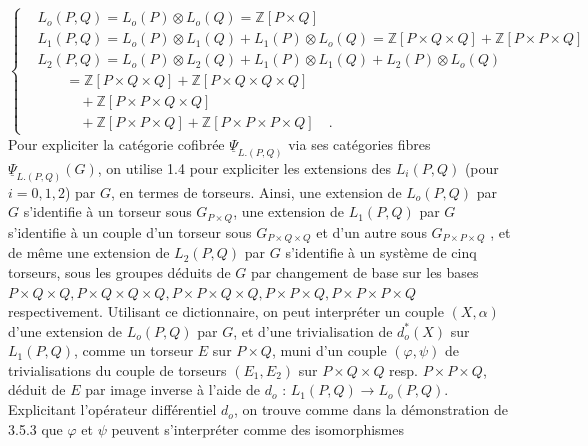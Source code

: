 \begin{equation}\tag{3.6.6}
\left\{
\begin{aligned}
&L_o(P,Q) = L_o(P) \otimes L_o(Q) = \mathbb{Z}[P\times Q] \\
&L_1(P,Q) = L_o(P) \otimes L_1(Q) + L_1(P) \otimes L_o(Q) = \mathbb{Z}[P\times Q\times Q] + \mathbb{Z}[P\times P\times Q] \\
&L_2(P,Q) = L_o(P) \otimes L_2(Q) + L_1(P) \otimes L_1(Q) + L_2(P) \otimes L_o(Q) \\
&\qquad = \mathbb{Z}[P\times Q\times Q] + \mathbb{Z}[P\times Q\times Q\times Q] \\
&\qquad\quad + \mathbb{Z}[P\times P\times Q\times Q] \\
&\qquad\quad + \mathbb{Z}[P\times P\times Q] + \mathbb{Z}[P\times P\times P\times Q] \quad .
\end{aligned}
\right.
\end{equation}
Pour expliciter la catégorie cofibrée $\underline{\Psi}_{L.(P,Q)}$ via ses catégories fibres $\underline{\Psi}_{L.(P,Q)}(G)$, on utilise 1.4 pour expliciter les extensions des $L_i(P,Q)$ (pour $i=0,1,2$) par $G$, en termes de torseurs. Ainsi, une extension de $L_o(P,Q)$ par $G$ s'identifie à un torseur sous $G_{P\times Q}$, une extension de $L_1(P,Q)$ par $G$ s'identifie à un couple d'un torseur sous $G_{P\times Q\times Q}$ et d'un autre sous $G_{P\times P\times Q}$ , et de même une extension de $L_2(P,Q)$ par $G$ s'identifie à un système de cinq torseurs, sous les groupes déduits de $G$ par changement de base sur les bases $P\times Q\times Q, P\times Q\times Q\times Q, P\times P\times Q\times Q, P\times P\times Q, P\times P\times P\times Q$ respectivement. Utilisant ce dictionnaire, on peut interpréter un couple $(X,\alpha)$ d'une extension de $L_o(P,Q)$ par $G$, et d'une trivialisation de $d_o^*(X)$ sur $L_1(P,Q)$, comme un torseur $E$ sur $P\times Q$, muni d'un couple $(\varphi,\psi)$ de trivialisations du couple de torseurs $(E_1,E_2)$ sur $P\times Q\times Q$ resp. $P\times P\times Q$, déduit de $E$ par image inverse
à l'aide de $d_o$ : $L_1(P,Q) \longrightarrow L_o(P,Q)$. Explicitant l'opérateur différentiel $d_o$, on trouve comme dans la démonstration de 3.5.3 que $\varphi$ et $\psi$ peuvent s'interpréter comme des isomorphismes

